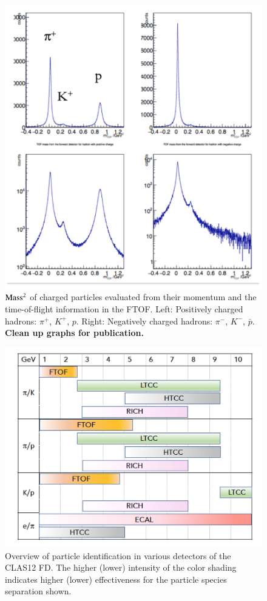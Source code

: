 \documentclass[final,3p,twocolumn]{elsarticle}
\begin{document}
\begin{figure}[htbp!]
\centerline{\includegraphics[width=1.0\columnwidth]{pid-1d.png}}
\caption{{$\rm Mass^2$} of charged particles evaluated from their momentum and the time-of-flight information in the
FTOF. Left: Positively charged hadrons: $\pi^+$, $K^+$, $p$. Right: Negatively charged hadrons: $\pi^-$, $K^-$,
${\bar{p}}$. {\bf Clean up graphs for publication.} }
\label{pid-1D}
\end{figure} 

\begin{figure}[htbp!]
\centerline{\includegraphics[width=1.1\columnwidth]{CLAS12-pid.png}}
\caption{Overview of particle identification in various detectors of the CLAS12 FD. The higher (lower) intensity of the
color shading indicates higher (lower) effectiveness for the particle species separation shown.} 
\label{pid1}
\end{figure} 
\end{document}
